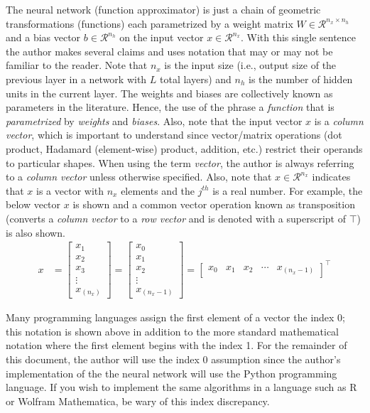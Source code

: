 \documentclass{article}
\begin{document}
\quad The neural network (function approximator) is just a chain of geometric transformations (functions)
each parametrized by a weight matrix $W \in \mathcal{R}^{n_x \times n_h}$ and
a bias vector $b \in \mathcal{R}^{n_h}$ on the input vector $x \in \mathcal{R}^{n_x}$.
With this single sentence the author makes several claims and uses notation that may
or may not be familiar to the reader.
Note that $n_x$ is the input size (i.e., output size of the previous layer in a network with $L$ total layers)
and $n_h$ is the number of hidden units in the current layer. The weights and biases
are collectively known as parameters in the literature. Hence, the use of the
phrase a \textit{function} that is \textit{parametrized} by \textit{weights} and \textit{biases}.
Also, note that the input vector $x$ is a \textit{column vector}, which is important
to understand since vector/matrix operations (dot product, Hadamard (element-wise)
product, addition, etc.) restrict their operands to particular shapes. When
using the term \textit{vector}, the author is always referring to a
\textit{column vector} unless otherwise specified. Also, note that $x \in \mathcal{R}^{n_x}$ indicates
that $x$ is a vector with $n_x$ elements and the $j^{th}$ is a real number.
For example, the below vector $x$ is shown and a common vector operation
known as transposition (converts a \textit{column vector} to a
\textit{row vector} and is denoted with a superscript of $\top$) is also shown.
\begin{align}
	x & = \begin{bmatrix}
		x_{1}  \\
		x_{2}  \\
		x_{3}  \\
		\vdots \\
		x_{(n_x)}
	\end{bmatrix}
	=
	\begin{bmatrix}
		x_{0}  \\
		x_{1}  \\
		x_{2}  \\
		\vdots \\
		x_{(n_{x}-1)}
	\end{bmatrix}
	=
	\begin{bmatrix}
		x_{0} & x_{1} & x_{2} & \cdots & x_{(n_{x}-1)}
	\end{bmatrix}^\top
\end{align}

Many programming languages assign the first element of a vector the index
0; this notation is shown above in addition to the more standard
mathematical notation where the first element begins with the index 1.
For the remainder of this document, the author will use the index 0 assumption
since the author's implementation of the the neural network will use the Python
programming language. If you wish to implement the same algorithms in a language
such as R or Wolfram Mathematica, be wary of this index discrepancy.
\end{document}

